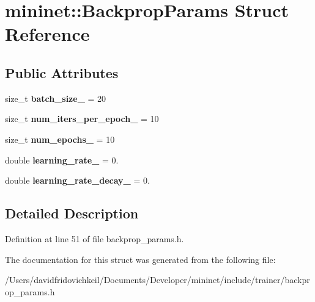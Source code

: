 \hypertarget{structmininet_1_1_backprop_params}{}\section{mininet\+:\+:Backprop\+Params Struct Reference}
\label{structmininet_1_1_backprop_params}
\subsection*{Public Attributes}
\begin{DoxyCompactItemize}
\item 
\hypertarget{structmininet_1_1_backprop_params_a89f75ef7b703abf69fde84f2df4e8648}{}\label{structmininet_1_1_backprop_params_a89f75ef7b703abf69fde84f2df4e8648} 
size\+\_\+t {\bfseries batch\+\_\+size\+\_\+} = 20
\item 
\hypertarget{structmininet_1_1_backprop_params_aa714c38be8deba2586ebb486a6f759dd}{}\label{structmininet_1_1_backprop_params_aa714c38be8deba2586ebb486a6f759dd} 
size\+\_\+t {\bfseries num\+\_\+iters\+\_\+per\+\_\+epoch\+\_\+} = 10
\item 
\hypertarget{structmininet_1_1_backprop_params_adf7d38efd1f9d8b12f69300c94b11bd6}{}\label{structmininet_1_1_backprop_params_adf7d38efd1f9d8b12f69300c94b11bd6} 
size\+\_\+t {\bfseries num\+\_\+epochs\+\_\+} = 10
\item 
\hypertarget{structmininet_1_1_backprop_params_ae7774867f9587f2f07a6fc8dc073585d}{}\label{structmininet_1_1_backprop_params_ae7774867f9587f2f07a6fc8dc073585d} 
double {\bfseries learning\+\_\+rate\+\_\+} = 0.
\item 
\hypertarget{structmininet_1_1_backprop_params_abf7115d0cc8e9ae54d1aec6b2fc4ae21}{}\label{structmininet_1_1_backprop_params_abf7115d0cc8e9ae54d1aec6b2fc4ae21} 
double {\bfseries learning\+\_\+rate\+\_\+decay\+\_\+} = 0.
\end{DoxyCompactItemize}


\subsection{Detailed Description}


Definition at line 51 of file backprop\+\_\+params.\+h.



The documentation for this struct was generated from the following file\+:\begin{DoxyCompactItemize}
\item 
/\+Users/davidfridovichkeil/\+Documents/\+Developer/mininet/include/trainer/backprop\+\_\+params.\+h\end{DoxyCompactItemize}
